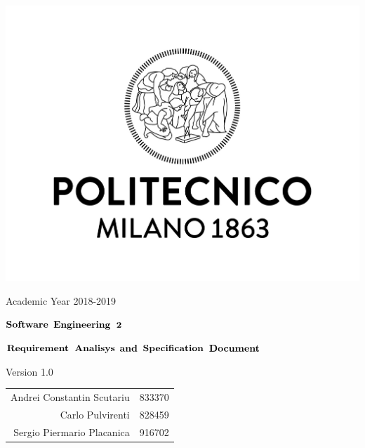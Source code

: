 \documentclass{article}
\author{
\and
\and
}
\date{}
\title{}
\begin{document}


\begin{center}
	\includegraphics[scale=0.15]{images/logoPolimi.jpg}
	
	Academic Year 2018-2019
	
	\vspace{3cm}
	
	\large $\bf \large Software$ $\bf Engineering$ $\bf 2$
	
	\vspace{3mm}
	
	\LARGE $\bf Requirement$  $\bf Analisys$ $\bf and$ $\bf Specification$ $\bf Document$
	
	\vspace{2mm}
	\small Version 1.0
	
	\vspace{5cm}
	
	\begin{tabular}{r|l}
		\large Andrei Constantin Scutariu & \large 833370\\
		\large Carlo Pulvirenti & \large 828459\\
		\large Sergio Piermario Placanica & \large 916702\\
	\end{tabular}
	
	
	\end{center}

\newpage
\end{document}
